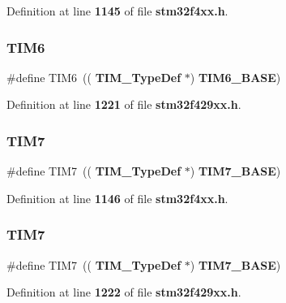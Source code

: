 Definition at line \textbf{ 1145} of file \textbf{ stm32f4xx.\+h}.

\mbox{\label{group__Peripheral__declaration_gac7b4ed55f9201b498b38c962cca97314}} 
\subsubsection{T\+I\+M6\hspace{0.1cm}{\footnotesize\ttfamily [2/2]}}
{\footnotesize\ttfamily \#define T\+I\+M6~((\textbf{ T\+I\+M\+\_\+\+Type\+Def} $\ast$) \textbf{ T\+I\+M6\+\_\+\+B\+A\+SE})}



Definition at line \textbf{ 1221} of file \textbf{ stm32f429xx.\+h}.

\mbox{\label{group__Peripheral__declaration_ga49267c49946fd61db6af8b49bcf16394}} 
\subsubsection{T\+I\+M7\hspace{0.1cm}{\footnotesize\ttfamily [1/2]}}
{\footnotesize\ttfamily \#define T\+I\+M7~((\textbf{ T\+I\+M\+\_\+\+Type\+Def} $\ast$) \textbf{ T\+I\+M7\+\_\+\+B\+A\+SE})}



Definition at line \textbf{ 1146} of file \textbf{ stm32f4xx.\+h}.

\mbox{\label{group__Peripheral__declaration_ga49267c49946fd61db6af8b49bcf16394}} 
\subsubsection{T\+I\+M7\hspace{0.1cm}{\footnotesize\ttfamily [2/2]}}
{\footnotesize\ttfamily \#define T\+I\+M7~((\textbf{ T\+I\+M\+\_\+\+Type\+Def} $\ast$) \textbf{ T\+I\+M7\+\_\+\+B\+A\+SE})}



Definition at line \textbf{ 1222} of file \textbf{ stm32f429xx.\+h}.

